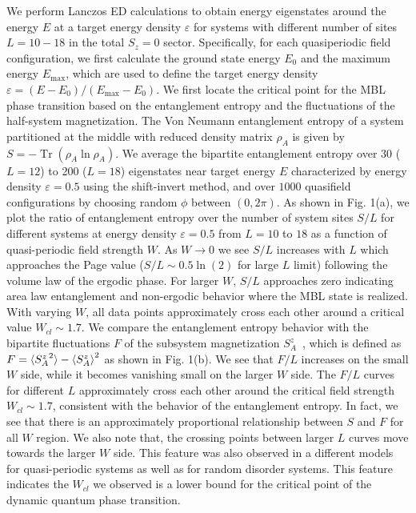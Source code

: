 \documentclass[prl,aps,epsf,showpacs,twocolumn,letterpaper]{revtex4}
\DeclareMathOperator{\tr}{Tr}
\begin{document}
We perform Lanczos ED calculations to obtain energy eigenstates around the energy $E$ at a target energy density $\varepsilon$\cite{luitz2015}    for systems with different number of sites $L=10-18$ in the total $S_z=0$ sector.  Specifically, for each quasiperiodic field configuration, we first calculate the ground state energy $E_0$ and the maximum energy $E_\text{max}$, which are used to define the target energy density $\varepsilon = (E-E_0)/(E_\text{max} -E_0)$.
We first locate the critical point for the MBL phase transition based on the entanglement entropy and the fluctuations of the half-system magnetization\cite{luitz2015}.  The Von Neumann entanglement entropy of a system partitioned at  the middle with reduced density matrix $\rho_A$ is given by $S=- \tr (\rho_A \ln \rho_A)$.  We average the bipartite entanglement entropy over 30 ($L=12$) to 200 ($L=18$) eigenstates near target energy $E$ characterized by energy density $\varepsilon=0.5$ using the shift-invert method, and over $1000$ quasifield  configurations by choosing random $\phi$ between $(0, 2\pi)$.  As shown in Fig. 1(a), we plot the ratio of entanglement entropy over the number of system sites $S/L$ for different systems at energy density $\varepsilon=0.5$ from $L=10$ to $18$ as a function of quasi-periodic field strength $W$.  As $W\to0$ we see $S/L$ increases with $L$ which approaches the Page value ($S/L \sim 0.5\ln(2)$ for large $L$ limit) following the volume law of the ergodic phase.  For larger $W$, $S/L$ approaches zero indicating area law entanglement and non-ergodic behavior where the MBL state is realized.  With varying $W$, all data points approximately cross each other around a critical value $W_{cl} \sim 1.7$.  We compare the entanglement entropy behavior with the bipartite fluctuations $F$ of the subsystem magnetization $S^z_A$~\cite{luitz2015,song2012}, which is defined as $F=\braket{{S^{z}_A}^2} - \braket{S^z_A}^2$ as shown in Fig. 1(b).  We see that $F/L$ increases on the small $W$ side, while it becomes vanishing small on the larger $W$ side.  The $F/L$ curves for different $L$ approximately cross each other around the  critical field strength $W_{cl}\sim1.7$, consistent with the behavior of the entanglement entropy.  In fact, we see that there is an approximately proportional relationship between $S$ and $F$  for all $W$ region. 
We also note that,  the crossing points between larger $L$ curves move towards the larger $W$ side.  This feature was also observed in a different models for quasi-periodic systems as well as for random disorder systems\cite{vedika2016, vedika2017}.  This feature indicates the $W_{cl}$ we observed is a lower bound for the critical point of the  dynamic quantum phase transition.  
\end{document}
